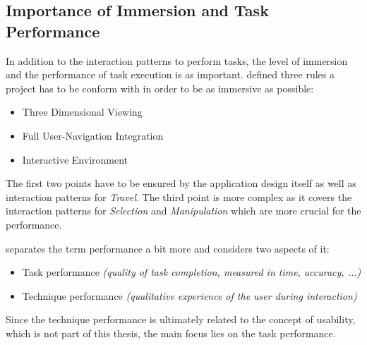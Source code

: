 
\subsection{Importance of Immersion and Task Performance}

In addition to the interaction patterns to perform tasks, the level of immersion and the performance of task execution is as important. \cite{Woodard2015} defined three rules a project has to be conform with in order to be as immersive as possible:
\begin{itemize}[noitemsep,nolistsep]
	\item Three Dimensional Viewing
	\item Full User-Navigation Integration
	\item Interactive Environment
\end{itemize}
The first two points have to be ensured by the application design itself as well as interaction patterns for \textit{Travel}. The third point is more complex as it covers the interaction patterns for \textit{Selection} and \textit{Manipulation} which are more crucial for the performance.

\cite{Bowman2002} separates the term performance a bit more and considers two aspects of it:
\begin{itemize}[noitemsep,nolistsep]
	\item Task performance \textit{(quality of task completion, measured in time, accuracy, ...)}
	\item Technique performance \textit{(qualitative experience of the user during interaction)}
\end{itemize}
Since the technique performance is ultimately related to the concept of usability, which is not part of this thesis, the main focus lies on the task performance.

